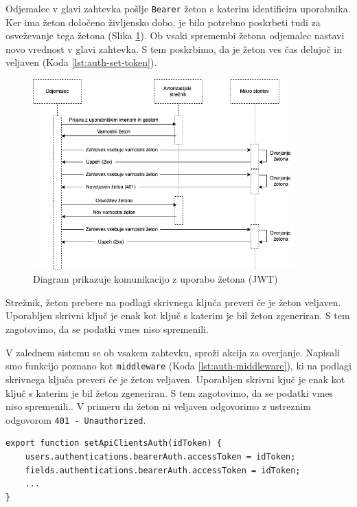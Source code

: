 \documentclass[a4paper, 12pt]{book}
\begin{document}
Odjemalec v glavi zahtevka pošlje \verb=Bearer= žeton s katerim identificira uporabnika. Ker ima žeton določeno življensko dobo, je bilo potrebno poskrbeti tudi za osveževanje tega žetona (Slika \ref{token-flow}). Ob vsaki spremembi žetona odjemalec nastavi novo vrednost v glavi zahtevka. S tem poskrbimo, da je žeton ves čas delujoč in veljaven (Koda \ref{lst:auth-set-token}).

\begin{figure}[h]
\begin{center}
\includegraphics[width=0.9\textwidth]{slike/token-flow.png}
\end{center}
\caption{ Diagram prikazuje komunikacijo z uporabo žetona (JWT) }
\label{token-flow}
\end{figure}

Strežnik, žeton prebere na podlagi skrivnega ključa preveri če je žeton veljaven. Uporabljen skrivni ključ je enak kot ključ s katerim je bil žeton zgeneriran. S tem zagotovimo, da se podatki vmes niso spremenili.

V zalednem sistemu se ob vsakem zahtevku, sproži akcija za overjanje. Napisali smo funkcijo poznano kot \verb=middleware= (Koda \ref{lst:auth-middleware}), ki na podlagi skrivnega ključa preveri če je žeton veljaven. Uporabljen skrivni kjuč je enak kot ključ s katerim je bil žeton zgeneriran. S tem zagotovimo, da se podatki vmes niso spremenili.. V primeru da žeton ni veljaven odgovorimo z ustreznim odgovorom \verb=401 - Unauthorized=. 

\begin{lstlisting}[style=mystyle,caption={Izsek kode za nastavljanje žetona posameznemu odjemalcu},label=lst:auth-set-token]
export function setApiClientsAuth(idToken) {
    users.authentications.bearerAuth.accessToken = idToken;
    fields.authentications.bearerAuth.accessToken = idToken;
    ...
}
\end{lstlisting}
\end{document}
